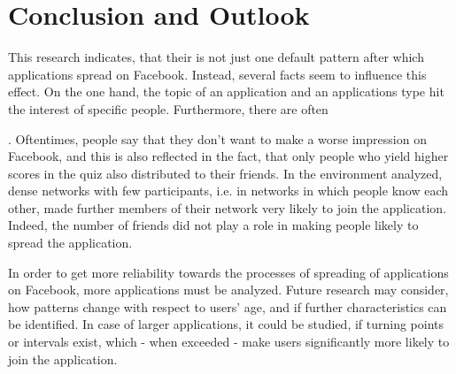 \documentclass[preprint,12pt]{elsarticle}
\begin{document}
\section{Conclusion and Outlook}
\label{sec:conclusion}
This research indicates, that their is not just one default pattern
after which applications spread on Facebook. Instead, several facts
seem to influence this effect. On the one hand, the topic of an
application and an applications type hit the interest of specific
people. Furthermore, there are often 

. Oftentimes, people say that they don't want to
make a worse impression on Facebook, and this is also reflected in the
fact, that only people who yield higher scores in the quiz also
distributed to their friends. In the environment analyzed, dense
networks with few participants, i.e. in networks in which people know
each other, made  further members of their network very likely to join
the application. Indeed, the number of friends did not play a role in
making people likely to spread the application.


In order to get more reliability towards the processes of spreading
of applications on Facebook, more applications must be analyzed.
Future research may consider, how patterns change with respect
to users' age, and if further characteristics can be identified. In
case of larger applications, it could be studied, if turning points
or intervals exist, which - when exceeded - make users significantly
more likely to join the application.












\end{document}

